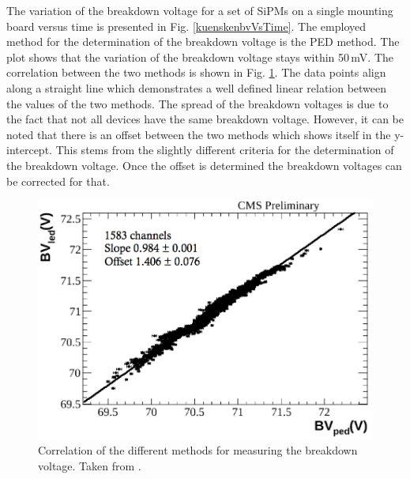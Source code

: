 The variation of the breakdown voltage for a set of SiPMs on a single mounting board versus time is presented in Fig. \ref{kuenskenbvVsTime}. The employed method for the determination of the breakdown voltage is the PED method. The plot shows that the variation of the breakdown voltage stays within 50\,mV. The correlation between the two methods is shown in Fig. \ref{kuenskenbvCorr}. The data points align along a straight line which demonstrates a well defined linear relation between the values of the two methods. The spread of the breakdown voltages is due to the fact that not all devices have the same breakdown voltage. However, it can be noted that there is an offset between the two methods which shows itself in the y-intercept. This stems from the slightly different criteria for the determination of the breakdown voltage. Once the offset is determined the breakdown voltages can be corrected for that.
\begin{figure}
\centering
\begin{minipage}[b]{0.475\textwidth}
\includegraphics[width=\textwidth]{Figures/kuensken/bvCorrelation.png}
\end{minipage}
\hspace{0.5cm}
\begin{minipage}[b]{0.475\textwidth}
\caption{Correlation of the different methods for measuring the breakdown voltage. Taken from \cite{kuenskenCalor}.}
\label{kuenskenbvCorr}
\end{minipage}
\end{figure}
